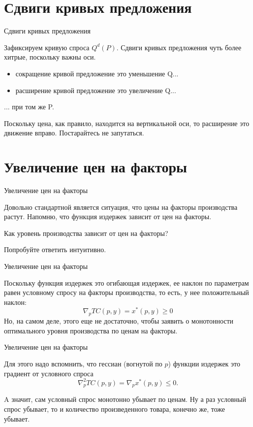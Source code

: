\documentclass{beamer}
\begin{document}
\section{Сдвиги кривых предложения}
\begin{frame}{Сдвиги кривых предложения}


Зафиксируем кривую спроса $Q^d(P)$. Сдвиги кривых предложения чуть более хитрые, поскольку важны оси.

\begin{itemize}
\item сокращение кривой предложение это уменьшение Q...
\item расширение кривой предложение это увеличение Q...
\end{itemize}

... при том же P.

Поскольку цена, как правило, находится на вертикальной оси, то расширение это движение вправо. Постарайтесь не запутаться.
	
\end{frame}

\section{Увеличение цен на факторы}

\begin{frame}{Увеличение цен на факторы}
	
Довольно стандартной является ситуация, что цены на факторы производства растут. Напомню, что функция издержек зависит от цен на факторы. 

Как уровень производства зависит от цен на факторы?

Попробуйте ответить интуитивно.
\end{frame}

\begin{frame}{Увеличение цен на факторы}
	
Поскольку функция издержек это огибающая издержек, ее наклон по параметрам равен условному спросу на факторы производства, то есть, у нее положительный наклон:
$$ \nabla_p TC(p, y) = x^{\ast}(p, y) \geqslant 0$$
Но, на самом деле, этого еще не достаточно, чтобы заявить о монотонности оптимального уровня производства по ценам на факторы. 
\end{frame}

\begin{frame}{Увеличение цен на факторы}
	
Для этого надо вспомнить, что гессиан (вогнутой по $p$) функции издержек это градиент от условного спроса
$$ \nabla^2_p TC(p, y) = \nabla_p x^{\ast}(p, y) \leqslant 0.$$

A значит, сам условный спрос монотонно убывает по ценам. Ну а раз условный спрос убывает, то и количество произведенного товара, конечно же, тоже убывает.
	
\end{frame}
\end{document}
